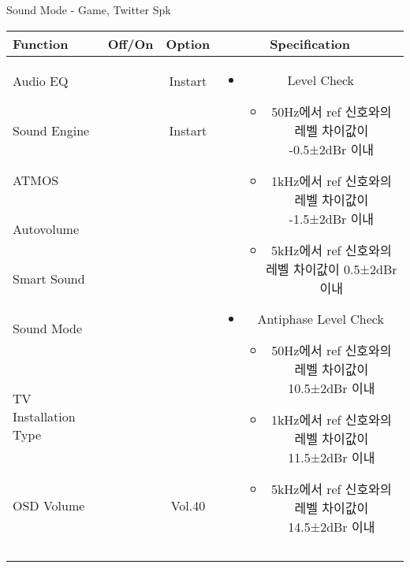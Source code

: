 \begin{frame}[t]{Sound Mode - Game, Twitter Spk}
\begin{tiny}
\begin{tabular}{@{}lccc@{}}
\toprule
Function & Off/On & Option & Specification \\
\midrule
Audio EQ & \color{black}{Off} & Instart &
\multirow{10}{60mm}{
\begin{itemize}
    \item Level Check
    \begin{itemize}
        \item 50Hz에서 ref 신호와의 레벨 차이값이 -0.5±2dBr 이내
        \item 1kHz에서 ref 신호와의 레벨 차이값이 -1.5±2dBr 이내
        \item 5kHz에서 ref 신호와의 레벨 차이값이 0.5±2dBr 이내
    \end{itemize}
    \item Antiphase Level Check
    \begin{itemize}
        \item 50Hz에서 ref 신호와의 레벨 차이값이 10.5±2dBr 이내
        \item 1kHz에서 ref 신호와의 레벨 차이값이 11.5±2dBr 이내
        \item 5kHz에서 ref 신호와의 레벨 차이값이 14.5±2dBr 이내
    \end{itemize}
\end{itemize}
} \\
Sound Engine & \color{blue}{On} & Instart & \\
ATMOS & \color{black}{Off}  & & \\
Autovolume & \color{black}{Off} & & \\
Smart Sound & \color{black}{Off} & & \\
Sound Mode & \color{blue}{On} & \color{blue}{Game} & \\
TV Installation Type & \color{blue}{On} & \color{black}{Standtype1} & \\
OSD Volume & \color{blue}{On} & Vol.40 & \\
& & & \\
& & & \\
& & & \\
& & & \\
\midrule
\end{tabular}
\end{tiny}

\end{frame}
